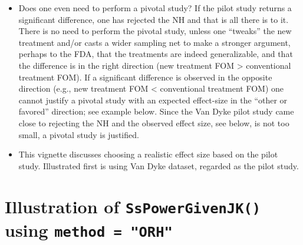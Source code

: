 \documentclass[]{book}
\newenvironment{Shaded}{\begin{snugshade}}{\end{snugshade}}
\newcommand{\CommentTok}[1]{\textcolor[rgb]{0.56,0.35,0.01}{\textit{#1}}}
\newcommand{\DataTypeTok}[1]{\textcolor[rgb]{0.13,0.29,0.53}{#1}}
\newcommand{\KeywordTok}[1]{\textcolor[rgb]{0.13,0.29,0.53}{\textbf{#1}}}
\newcommand{\NormalTok}[1]{#1}
\newcommand{\OperatorTok}[1]{\textcolor[rgb]{0.81,0.36,0.00}{\textbf{#1}}}
\newcommand{\StringTok}[1]{\textcolor[rgb]{0.31,0.60,0.02}{#1}}
\begin{document}
\begin{itemize}
\item
  Does one even need to perform a pivotal study? If the pilot study returns a significant difference, one has rejected the NH and that is all there is to it. There is no need to perform the pivotal study, unless one ``tweaks'' the new treatment and/or casts a wider sampling net to make a stronger argument, perhaps to the FDA, that the treatments are indeed generalizable, and that the difference is in the right direction (new treatment FOM \textgreater{} conventional treatment FOM). If a significant difference is observed in the opposite direction (e.g., new treatment FOM \textless{} conventional treatment FOM) one cannot justify a pivotal study with an expected effect-size in the ``other or favored'' direction; see example below. Since the Van Dyke pilot study came close to rejecting the NH and the observed effect size, see below, is not too small, a pivotal study is justified.
\item
  This vignette discusses choosing a realistic effect size based on the pilot study. Illustrated first is using Van Dyke dataset, regarded as the pilot study.
\end{itemize}

\hypertarget{illustration-of-sspowergivenjk-using-method-orh-1}{%
\section{\texorpdfstring{Illustration of \texttt{SsPowerGivenJK()} using \texttt{method\ =\ "ORH"}}{Illustration of SsPowerGivenJK() using method = "ORH"}}\label{illustration-of-sspowergivenjk-using-method-orh-1}}

\begin{Shaded}
\end{Shaded}
\end{document}
